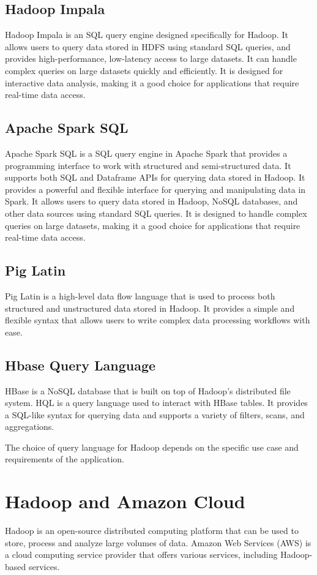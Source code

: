 \documentclass[12pt]{article}
\begin{document}
\subsection{Hadoop Impala}
Hadoop Impala is an SQL query engine designed specifically for Hadoop. It allows users to query data stored in HDFS using standard SQL queries, and provides high-performance, low-latency access to large datasets. It can handle complex queries on large datasets quickly and efficiently. It is designed for interactive data analysis, making it a good choice for applications that require real-time data access.
\subsection{Apache Spark SQL}
Apache Spark SQL is a SQL query engine in Apache Spark that provides a programming interface to work with structured and semi-structured data. It supports both SQL and Dataframe APIs for querying data stored in Hadoop. It provides a powerful and flexible interface for querying and manipulating data in Spark. It allows users to query data stored in Hadoop, NoSQL databases, and other data sources using standard SQL queries. It is designed to handle complex queries on large datasets, making it a good choice for applications that require real-time data access.
\subsection{Pig Latin}
Pig Latin is a high-level data flow language that is used to process both structured and unstructured data stored in Hadoop. It provides a simple and flexible syntax that allows users to write complex data processing workflows with ease.
\subsection{Hbase Query Language}
HBase is a NoSQL database that is built on top of Hadoop's distributed file system. HQL is a query language used to interact with HBase tables. It provides a SQL-like syntax for querying data and supports a variety of filters, scans, and aggregations.

The choice of query language for Hadoop depends on the specific use case and requirements of the application.
\section{Hadoop and Amazon Cloud}
Hadoop is an open-source distributed computing platform that can be used to store, process and analyze large volumes of data. Amazon Web Services (AWS) is a cloud computing service provider that offers various services, including Hadoop-based services.
\end{document}
